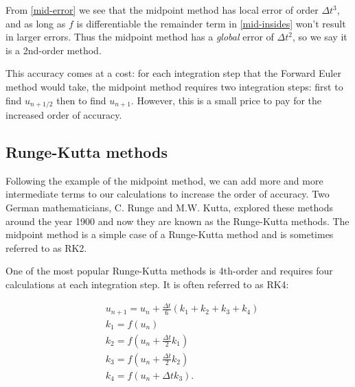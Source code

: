 \documentclass{article}
\newcommand{\dt}{\Delta t}
\newcommand{\uni}{u_{n+1}}
\newcommand{\unhalf}{u_{n+1/2}}
\begin{document}
From \eqref{mid-error} we see that the midpoint method has local error of order $\dt^3$,
and as long as $f$ is differentiable the remainder term in \eqref{mid-insides} won't
result in larger errors. Thus the midpoint method has a \emph{global} error of $\dt^2$,
so we say it is a 2nd-order method.

This accuracy comes at a cost: for each integration step that the Forward Euler method would take,
the midpoint method requires two integration steps:
first to find $\unhalf$ then to find $\uni$.
However, this is a small price to pay for the increased order of accuracy.

\subsection{Runge-Kutta methods}

Following the example of the midpoint method, we can add more and more intermediate terms
to our calculations to increase the order of accuracy. Two German mathematicians, C. Runge and M.W. Kutta,
explored these methods around the year 1900 and now they are known as the Runge-Kutta methods.
The midpoint method is a simple case of a Runge-Kutta method and is sometimes referred to as RK2.

One of the most popular Runge-Kutta methods is 4th-order and requires 
four calculations at each integration step. It is often referred to as RK4:

\begin{equation}
    \boxed{\begin{split}
        &\uni = u_n + \frac{\dt}{6} (k_1 + k_2 + k_3 + k_4) \\
        &k_1 = f(u_n) \\ 
        &k_2 = f(u_n + \frac{\dt}{2} k_1) \\ 
        &k_3 = f(u_n + \frac{\dt}{2} k_2) \\ 
        &k_4 = f(u_n + \dt k_3).
    \end{split}}
    \label{rk4}
    \tag{RK4}
\end{equation}
\end{document}
